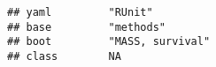 \documentclass[]{book}
\begin{document}
\begin{verbatim}
## yaml         "RUnit"                                                                                                                                                                                                                                                                                                                                                                                                                                                                                                                                                                                                                                                                                                   
## base         "methods"                                                                                                                                                                                                                                                                                                                                                                                                                                                                                                                                                                                                                                                                                                 
## boot         "MASS, survival"                                                                                                                                                                                                                                                                                                                                                                                                                                                                                                                                                                                                                                                                                          
## class        NA                                                                                                                                                                                                                                                                                                                                                                                                                                                                                                                                                                                                                                                                                                        

\end{verbatim}
\end{document}
